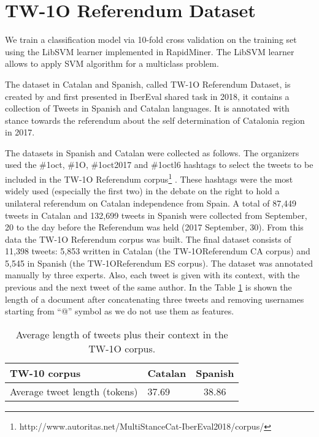 \documentclass[10pt, a4paper]{article}
\begin{document}
\section{TW-1O Referendum Dataset}\label{sec:tw1o_dataset}

We train a classification model via 10-fold cross validation on the training set using the LibSVM learner \cite{Fan2005} implemented in RapidMiner. The LibSVM learner allows to apply SVM algorithm for a multiclass problem.

The dataset in Catalan and Spanish, called TW-1O Referendum Dataset, is created by \cite{taule18} and first presented in IberEval shared task in 2018, it contains a collection of Tweets in Spanish and Catalan languages. It is annotated with stance towards the referendum about the self determination of Catalonia region in 2017.

The datasets in Spanish and Catalan were collected as follows. The organizers used the \#1oct, \#1O, \#1oct2017 and \#1octl6 hashtags to select the tweets to be included in the TW-1O Referendum corpus\footnote{http://www.autoritas.net/MultiStanceCat-IberEval2018/corpus/} \cite{taule18}. These hashtags were the most widely used (especially the first two) in the debate on the right to hold a unilateral referendum on Catalan independence from Spain. A total of 87,449 tweets in Catalan and 132,699 tweets in Spanish were collected from September, 20 to the day before the Referendum was held (2017 September, 30). From this data the TW-1O Referendum corpus was built. The final dataset consists of 11,398 tweets: 5,853 written in Catalan (the TW-1OReferendum CA corpus) and 5,545 in Spanish (the TW-1OReferendum ES corpus). The dataset was annotated manually by three experts. Also, each tweet is given with its context, with the previous and the next tweet of the same author. In the Table \ref{tab:length_tw_dataset} is shown the length of a document after concatenating three tweets and removing usernames starting from ``@'' symbol as we do not use them as features.

\begin{table}[!ht]
\begin{tabular}{llc} \hline
  TW-10 corpus & Catalan & Spanish \\ \hline
  Average tweet length (tokens) & 37.69 & 38.86\\ \hline
\end{tabular}
\caption{Average length of tweets plus their context in the TW-1O corpus.}\label{tab:length_tw_dataset}
\end{table}
\end{document}
